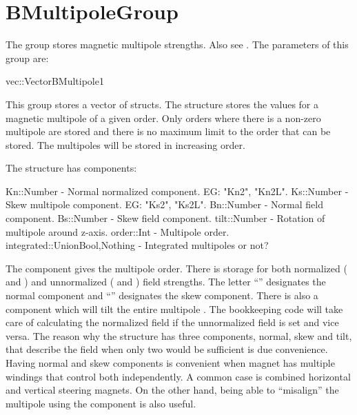 \section{BMultipoleGroup}
\label{s:bmultipole.g}

The  group stores magnetic multipole strengths. Also see .
The parameters of this group are:
\begin{example}
  vec::Vector{BMultipole1}
\end{example}
This group stores a vector of  structs.
The  structure stores the values for a magnetic multipole of a given order.
Only orders where there is a non-zero multipole are stored and there is no maximum limit to the 
order that can be stored. The multipoles will be stored in increasing order.

The  structure has components:
\begin{example}
  Kn::Number     - Normal normalized component. EG: "Kn2", "Kn2L".
  Ks::Number     - Skew multipole component. EG: "Ks2", "Ks2L".
  Bn::Number     - Normal field component.
  Bs::Number     - Skew field component.
  tilt::Number   - Rotation of multipole around z-axis.
  order::Int     - Multipole order.
  integrated::Union{Bool,Nothing} - Integrated multipoles or not? 
\end{example}
The  component gives the multipole order.
There is storage for both normalized ( and ) and unnormalized ( and )
field strengths. The letter ``'' designates the normal component and ``'' designates
the skew component. 
There is also a  component which will tilt the entire multipole \cite{???}.
The \accellat bookkeeping code will take care of calculating the normalized field if the unnormalized
field is set and vice versa. The reason why the structure has three components, 
normal, skew and tilt, that describe the field when only two would be sufficient is due convenience.
Having normal and skew components is convenient when magnet has multiple windings that control
both independently. A common case is combined horizontal and vertical steering magnets. On the
other hand, being able to ``misalign'' the multipole using the  component is also
useful.

